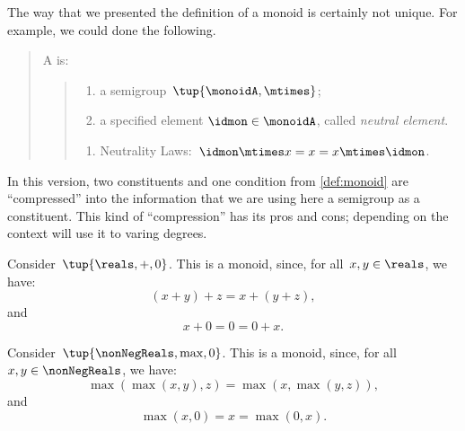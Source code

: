 \begin{remark}
The way that we presented the definition of a monoid is certainly not unique. For example, we could done the following. 

\begin{quote}
  A \emph{} is: 
\begin{quote}
   \constit
   \begin{enumerate}
    \item a semigroup~$\tup{\monoidA, \mtimes}$;
    \item a specified element $\idmon\in \monoidA$, called \emph{neutral element}.
  \end{enumerate}
\condit
  \begin{enumerate}
    \item Neutrality Laws:~$\idmon\mtimes x=x=x\mtimes \idmon$.
  \end{enumerate}
  \end{quote}
\end{quote}
In this version, two constituents and one condition from \cref{def:monoid} are ``compressed'' into the information that we are using here a semigroup as a constituent. This kind of ``compression'' has its pros and cons; depending on the context will use it to varing degrees. 
\end{remark}

\begin{example}
  Consider~$\tup{\reals,+,0}$. This is a monoid, since, for all~$x,y\in \reals$, we have:
  \begin{equation*}
  (x+y)
    +z=x+(y+z),
  \end{equation*}
  and
  \begin{equation*}
    x+0=0=0+x.
  \end{equation*}
\end{example}

\begin{example}
  Consider~$\tup{\nonNegReals,\max,0}$. This is a monoid, since, for all~$x,y\in \nonNegReals$, we have:
  \begin{equation*}
    \max(\max(x,y),z)=\max(x,\max(y,z)),
  \end{equation*}
  and
  \begin{equation*}
    \max(x,0)=x=\max(0,x).
  \end{equation*}
\end{example}

